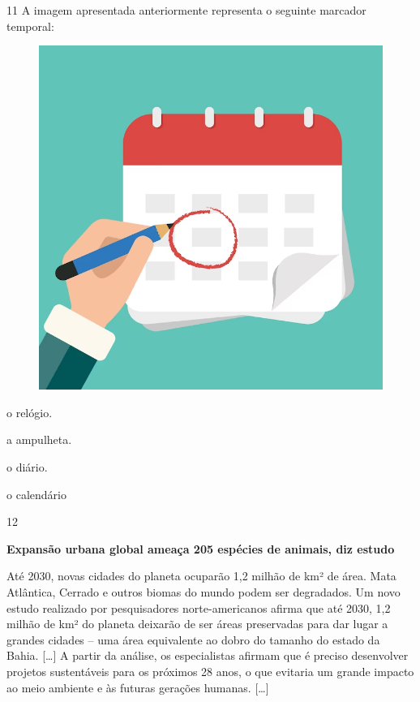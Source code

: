 \pagebreak
\num{11} A imagem apresentada anteriormente representa o seguinte marcador temporal:

\begin{figure}[htpb!]
\centering
\includegraphics[width=.7\textwidth]{./imgs/img69.png}
\end{figure}

\begin{escolha}
\item o relógio.

\item a ampulheta.

\item o diário.

\item o calendário
\end{escolha}

\num{12}

\begin{myquote}
\textbf{Expansão urbana global ameaça 205 espécies de animais, diz estudo}

Até 2030, novas cidades do planeta ocuparão 1,2 milhão de km² de área.
Mata Atlântica, Cerrado e outros biomas do mundo podem ser degradados.
Um novo estudo realizado por pesquisadores norte-americanos afirma que
até 2030, 1,2 milhão de km² do planeta deixarão de ser áreas preservadas
para dar lugar a grandes cidades – uma área equivalente ao dobro do
tamanho do estado da Bahia. {[}\ldots{}{]}
A partir da análise, os especialistas
afirmam que é preciso desenvolver projetos sustentáveis para os próximos
28 anos, o que evitaria um grande impacto ao meio ambiente e às futuras
gerações humanas. {[}\ldots{}{]}

\end{myquote}

